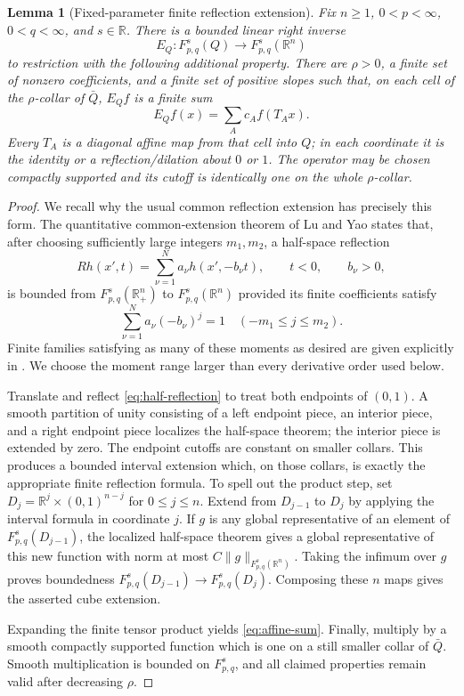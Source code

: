 \documentclass[11pt]{article}
\newtheorem{lemma}[theorem]{Lemma}
\newcommand{\R}{\mathbb R}
\begin{document}
\begin{lemma}[Fixed-parameter finite reflection extension]\label{lem:extension}
Fix $n\ge1$, $0<p<\infty$, $0<q<\infty$, and $s\in\R$.  There is a bounded
linear right inverse
\[
 E_Q:F_{p,q}^s(Q)\longrightarrow F_{p,q}^s(\R^n)
\]
to restriction with the following additional property.  There are
$\rho>0$, a finite set of nonzero coefficients, and a finite set of
positive slopes such that, on each cell of the $\rho$-collar of $\bar Q$,
$E_Qf$ is a finite sum
\begin{equation}\label{eq:affine-sum}
 E_Qf(x)=\sum_A c_A f(T_Ax).
\end{equation}
Every $T_A$ is a diagonal affine map from that cell into $Q$; in each
coordinate it is the identity or a reflection/dilation about $0$ or $1$.
The operator may be chosen compactly supported and its cutoff is identically
one on the whole $\rho$-collar.
\end{lemma}

\begin{proof}
We recall why the usual common reflection extension has precisely this
form.  The quantitative common-extension theorem of Lu and Yao
\cite[Theorem~23]{LuYao} states that, after choosing sufficiently large
integers $m_1,m_2$, a half-space reflection
\begin{equation}\label{eq:half-reflection}
 Rh(x',t)=\sum_{\nu=1}^N a_\nu h(x',-b_\nu t),
 \qquad t<0,\qquad b_\nu>0,
\end{equation}
is bounded from $F_{p,q}^s(\R^n_+)$ to $F_{p,q}^s(\R^n)$ provided its
finite coefficients satisfy
\[
 \sum_{\nu=1}^N a_\nu(-b_\nu)^j=1
 \quad(-m_1\le j\le m_2).
\]
Finite families satisfying as many of these moments as desired are given
explicitly in \cite[(29)--(30)]{LuYao}.  We choose the moment range larger
than every derivative order used below.

Translate and reflect \eqref{eq:half-reflection} to treat both endpoints
of $(0,1)$.  A smooth partition of unity consisting of a left endpoint
piece, an interior piece, and a right endpoint piece localizes the
half-space theorem; the interior piece is extended by zero.  The endpoint
cutoffs are constant on smaller collars.  This produces a bounded interval
extension which, on those collars, is exactly the appropriate finite
reflection formula.  To spell out the product step, set
$D_j=\R^j\times(0,1)^{n-j}$ for $0\le j\le n$.  Extend from $D_{j-1}$ to
$D_j$ by applying the interval formula in coordinate $j$.  If $g$ is any
global representative of an element of $F_{p,q}^s(D_{j-1})$, the localized
half-space theorem gives a global representative of this new function with
norm at most $C\|g\|_{F_{p,q}^s(\R^n)}$.  Taking the infimum over $g$ proves
boundedness $F_{p,q}^s(D_{j-1})\to F_{p,q}^s(D_j)$.  Composing these $n$
maps gives the asserted cube extension.

Expanding the finite tensor product yields \eqref{eq:affine-sum}.  Finally,
multiply by a smooth compactly supported function which is one on a still
smaller collar of $\bar Q$.  Smooth multiplication is bounded on
$F_{p,q}^s$, and all claimed properties remain valid after decreasing
$\rho$.
\end{proof}
\end{document}

